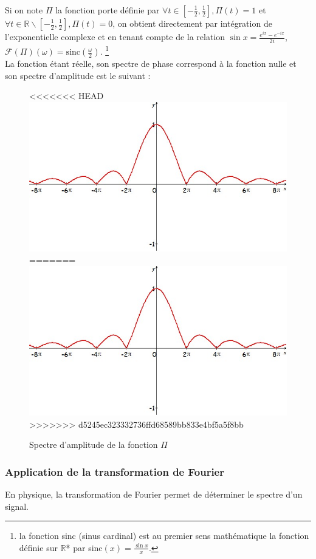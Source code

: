 Si on note $\Pi$ la fonction porte définie par 
$\forall t\in \left[-\frac{1}{2},\frac{1}{2} \right],\Pi(t)=1$ et $\forall t\in \mathbb{R} \backslash \left[-\frac{1}{2},\frac{1}{2} \right],\Pi(t)=0$, on obtient directement par intégration de l'exponentielle complexe et en tenant compte de la relation $\sin x = \displaystyle\frac{e^{ix}-e^{-ix}}{2i}$,
$\mathcal{F}(\Pi)(\omega) = \mathrm{sinc}(\frac{\omega}{2})$.  \footnote{la fonction sinc (sinus cardinal) est au premier sens mathématique la fonction définie sur $\mathbb{R}$* par sinc$(x)=\frac{\sin x}{x}$.} \\ La fonction étant réelle, son spectre de phase correspond à la fonction nulle et son spectre d'amplitude est le suivant : 
\begin{figure}[!h]
\centering
<<<<<<< HEAD
\includegraphics[scale=0.5]{sinc.jpg}
=======
\includegraphics[scale=0.5]{images/sinc.jpg}
>>>>>>> d5245ec323332736ffd68589bb833e4bf5a5f8bb
\caption{Spectre d'amplitude de la fonction $\Pi$}
\end{figure}


\subsubsection{Application de la transformation de Fourier}
En physique, la transformation de Fourier permet de déterminer le spectre d'un signal. 

